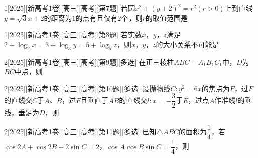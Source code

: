 \begin{example}{1}[2025][新高考1卷][高三][高考][第7题]
若圆$x^2+(y+2)^2=r^2(r>0)$上到直线$y=\sqrt{3}x+2$的距离为$1$的点有且仅有$2$个，则$r$的取值范围是\blankbox
\begin{choices}
\end{choices}
\end{example}

\begin{example}{1}[2025][新高考1卷][高三][高考][第8题]
若实数$x$，$y$，$z$满足$2+\log_2x=3+\log_3y=5+\log_5z$，则$x$，$y$，$z$的大小关系不可能是\blankbox
\begin{choices}
\end{choices}
\end{example}

\begin{example}{2}[2025][新高考1卷][高三][高考][第9题][多选]
在正三棱柱$ABC-A_1B_1C_1$中，$D$为$BC$中点，则\blankbox
\begin{choices}
\end{choices}
\end{example}

\begin{example}{2}[2025][新高考1卷][高三][高考][第10题][多选]
设抛物线$C:y^2=6x$的焦点为$F$，过$F$的直线交$C$于$A$、$B$，过$F$且垂直于$AB$的直线交$l:x=-\dfrac{3}{2}$于$E$，过点$A$作准线$l$的垂线，垂足为$D$，则\blankbox
\begin{choices}
\end{choices}
\end{example}

\begin{example}{2}[2025][新高考1卷][高三][高考][第11题][多选]
已知$\triangle ABC$的面积为$\dfrac{1}{4}$，若$\cos2A+\cos2B+2\sin C=2$，$\cos A\cos B\sin C=\dfrac{1}{4}$，则\blankbox
\begin{choices}
\end{choices}
\end{example}

